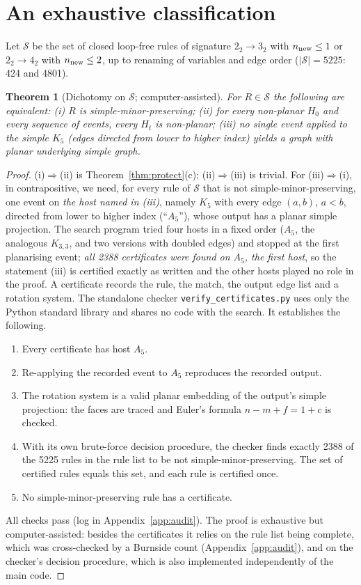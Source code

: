 \documentclass[10pt]{article}
\theoremstyle{definition}
\theoremstyle{plain}
\newtheorem{theorem}{Theorem}
\theoremstyle{remark}
\begin{document}
\section{An exhaustive classification}\label{sec:class}
Let $\mathcal S$ be the set of closed loop-free rules of signature $2_2\to3_2$ with $n_{\rm new}\le1$ or $2_2\to4_2$ with $n_{\rm new}\le2$, up to renaming of variables and edge order ($|\mathcal S|=5225$: 424 and 4801).
\begin{theorem}[Dichotomy on $\mathcal S$; computer-assisted]\label{thm:dichotomy}
For $R\in\mathcal S$ the following are equivalent: (i) $R$ is simple-minor-preserving; (ii) for every non-planar $H_0$ and every sequence of events, every $H_t$ is non-planar; (iii) no single event applied to the simple $K_5$ (edges directed from lower to higher index) yields a graph with planar underlying simple graph.
\end{theorem}
\begin{proof}
(i)$\Rightarrow$(ii) is Theorem~\ref{thm:protect}(c); (ii)$\Rightarrow$(iii) is trivial. For (iii)$\Rightarrow$(i), in contrapositive, we need, for every rule of $\mathcal S$ that is not simple-minor-preserving, one event on \emph{the host named in (iii)}, namely $K_5$ with every edge $(a,b)$, $a<b$, directed from lower to higher index (``$A_5$''), whose output has a planar simple projection. The search program tried four hosts in a fixed order ($A_5$, the analogous $K_{3,3}$, and two versions with doubled edges) and stopped at the first planarising event; \emph{all 2388 certificates were found on $A_5$, the first host}, so the statement (iii) is certified exactly as written and the other hosts played no role in the proof. A certificate records the rule, the match, the output edge list and a rotation system. The standalone checker \texttt{verify\_certificates.py} uses only the Python standard library and shares no code with the search. It establishes the following.
\begin{enumerate}
\item Every certificate has host $A_5$.
\item Re-applying the recorded event to $A_5$ reproduces the recorded output.
\item The rotation system is a valid planar embedding of the output's simple projection: the faces are traced and Euler's formula $n-m+f=1+c$ is checked.
\item With its own brute-force decision procedure, the checker finds exactly 2388 of the 5225 rules in the rule list to be not simple-minor-preserving. The set of certified rules equals this set, and each rule is certified once.
\item No simple-minor-preserving rule has a certificate.
\end{enumerate}
All checks pass (log in Appendix~\ref{app:audit}). The proof is exhaustive but computer-assisted: besides the certificates it relies on the rule list being complete, which was cross-checked by a Burnside count (Appendix~\ref{app:audit}), and on the checker's decision procedure, which is also implemented independently of the main code.
\end{proof}
\end{document}
